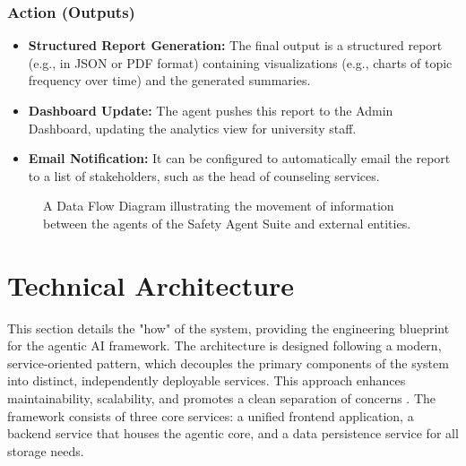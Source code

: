 \subsubsection{Action (Outputs)}
\begin{itemize}
    \item \textbf{Structured Report Generation:} The final output is a structured report (e.g., in JSON or PDF format) containing visualizations (e.g., charts of topic frequency over time) and the generated summaries.
    \item \textbf{Dashboard Update:} The agent pushes this report to the Admin Dashboard, updating the analytics view for university staff.
    \item \textbf{Email Notification:} It can be configured to automatically email the report to a list of stakeholders, such as the head of counseling services.
\end{itemize}

\begin{figure}[h]
    \centering
    \caption{A Data Flow Diagram illustrating the movement of information between the agents of the Safety Agent Suite and external entities.}
    \label{fig:dfd}
\end{figure}



\section{Technical Architecture}
\label{chap:technical_architecture}

This section details the "how" of the system, providing the engineering blueprint for the agentic AI framework. The architecture is designed following a modern, service-oriented pattern, which decouples the primary components of the system into distinct, independently deployable services. This approach enhances maintainability, scalability, and promotes a clean separation of concerns \cite{newman2021buildingmicroservices, richards2020softwarearchitecture}. The framework consists of three core services: a unified frontend application, a backend service that houses the agentic core, and a data persistence service for all storage needs.

